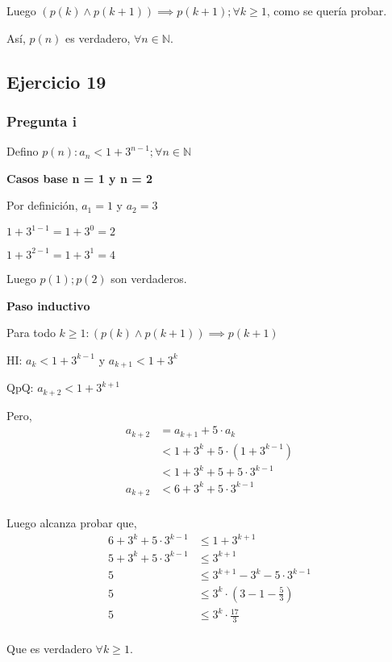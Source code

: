 Luego $(p(k) \wedge p(k+1)) \implies p(k+1); \forall k \geq 1$, como se quería probar.

Así, $p(n)$ es verdadero, $\forall n \in \mathbb{N}$.

\subsection{Ejercicio 19}

\subsubsection{Pregunta i}

Defino $ p(n): a_n < 1 + 3^{n-1}; \forall n \in \mathbb{N}$

\textbf{Casos base n = 1 y n = 2}

Por definición, $a_1 = 1$ y $a_2 = 3$

$ 1 + 3^{1-1} = 1 + 3^0 = 2$

$ 1 + 3^{2-1} = 1 + 3^1 = 4$

Luego $ p(1); p(2) $ son verdaderos.

\textbf{Paso inductivo}

Para todo $k \geq 1: (p(k) \wedge p(k+1)) \implies p(k+1)$

HI: $ a_k < 1 + 3^{k-1} $ y $ a_{k+1} < 1 + 3^k $

QpQ: $ a_{k+2} < 1 + 3^{k+1} $

Pero,
\begin{align*}
    a_{k+2} &= a_{k+1} + 5\cdot a_k \\
    &< 1 + 3^k + 5\cdot (1 + 3^{k-1}) \\
    &< 1 + 3^k + 5 + 5\cdot 3^{k-1} \\
    a_{k+2} &< 6 + 3^k + 5\cdot 3^{k-1} \\
\end{align*}

Luego alcanza probar que,
\begin{align*}
    6 + 3^k + 5\cdot 3^{k-1} &\leq 1 + 3^{k+1} \\
    5 + 3^k + 5\cdot 3^{k-1} &\leq 3^{k+1} \\
    5 &\leq 3^{k+1} - 3^k - 5\cdot 3^{k-1} \\
    5 &\leq 3^k \cdot (3 - 1 - \frac{5}{3})\\
    5 &\leq 3^k \cdot \frac{17}{3}\\
\end{align*}

Que es verdadero $ \forall k \geq 1 $.


